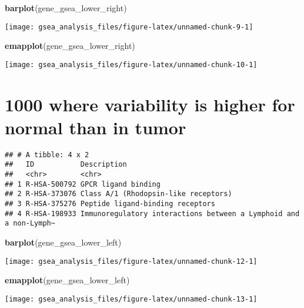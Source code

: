 \documentclass[
]{article}
\newenvironment{Shaded}{\begin{snugshade}}{\end{snugshade}}
\newcommand{\KeywordTok}[1]{\textcolor[rgb]{0.13,0.29,0.53}{\textbf{#1}}}
\newcommand{\NormalTok}[1]{#1}
\newcommand{\OperatorTok}[1]{\textcolor[rgb]{0.81,0.36,0.00}{\textbf{#1}}}
\newcommand{\StringTok}[1]{\textcolor[rgb]{0.31,0.60,0.02}{#1}}
\begin{document}
\begin{Shaded}
\begin{Highlighting}[]
\KeywordTok{barplot}\NormalTok{(gene_gsea_lower_right)}
\end{Highlighting}
\end{Shaded}

\texttt{[image: gsea\_analysis\_files/figure-latex/unnamed-chunk-9-1]}

\begin{Shaded}
\begin{Highlighting}[]
\KeywordTok{emapplot}\NormalTok{(gene_gsea_lower_right)}
\end{Highlighting}
\end{Shaded}

\texttt{[image: gsea\_analysis\_files/figure-latex/unnamed-chunk-10-1]}

\hypertarget{where-variability-is-higher-for-normal-than-in-tumor}{%
\section{1000 where variability is higher for normal than in
tumor}\label{where-variability-is-higher-for-normal-than-in-tumor}}

\begin{Shaded}
\end{Shaded}

\begin{verbatim}
## # A tibble: 4 x 2
##   ID           Description                                                      
##   <chr>        <chr>                                                            
## 1 R-HSA-500792 GPCR ligand binding                                              
## 2 R-HSA-373076 Class A/1 (Rhodopsin-like receptors)                             
## 3 R-HSA-375276 Peptide ligand-binding receptors                                 
## 4 R-HSA-198933 Immunoregulatory interactions between a Lymphoid and a non-Lymph~
\end{verbatim}

\begin{Shaded}
\begin{Highlighting}[]
\KeywordTok{barplot}\NormalTok{(gene_gsea_lower_left)}
\end{Highlighting}
\end{Shaded}

\texttt{[image: gsea\_analysis\_files/figure-latex/unnamed-chunk-12-1]}

\begin{Shaded}
\begin{Highlighting}[]
\KeywordTok{emapplot}\NormalTok{(gene_gsea_lower_left)}
\end{Highlighting}
\end{Shaded}

\texttt{[image: gsea\_analysis\_files/figure-latex/unnamed-chunk-13-1]}
\end{document}
